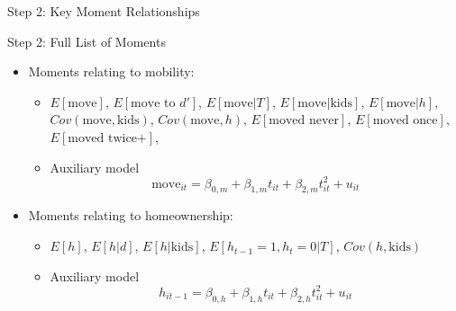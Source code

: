 \documentclass[12pt,english, aspectratio=169]{beamer}
\begin{document}
\begin{frame}{Step 2: Key Moment Relationships}

\hspace*{-2pt}
\end{frame}

\begin{longv}


\begin{frame}{Step 2: Full List of Moments}

\begin{itemize}
\item Moments relating to mobility:
\begin{itemize}

\item $E[\text{move}]$, $E\left[\text{move to }d'\right]$, $E[\text{move}|T]$,
$E[\text{move}|\text{kids}]$, $E[\text{move}|h]$, $Cov(\text{move},\text{kids})$,
$Cov(\text{move},h)$, $E[\text{moved never}]$, $E[\text{moved once}]$,
$E[\text{moved twice+}]$, 
\item Auxiliary model
\[
\text{move}_{it}=\beta_{0,m}+\beta_{1,m}t_{it}+\beta_{2,m}t_{it}^{2}+u_{it}
\]
\end{itemize}
\item Moments relating to homeownership:

\begin{itemize}
\item $E[h]$, $E[h|d]$, $E[h|\text{kids}]$, $E[h_{t-1}=1,h_{t}=0|T]$,
$Cov(h,\text{kids})$
\item Auxiliary model
\[
h_{it-1}=\beta_{0,h}+\beta_{1,h}t_{it}+\beta_{2,h}t_{it}^{2}+u_{it}
\]
\end{itemize}
\hypertarget{moments}{}
\begin{flushright}
\hyperlink{param-estimates}{}\par
\end{flushright}

\end{itemize}
\end{frame}
\end{longv}
\end{document}
